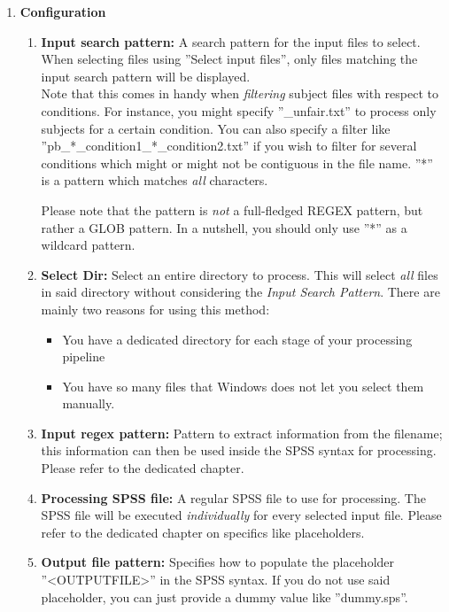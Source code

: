 \documentclass[]{article}
\newcommand{\ph}[1]{{\textless}#1{\textgreater}}
\begin{document}
\begin{enumerate}
	\item \textbf{Configuration}
\begin{enumerate}
	\item \textbf{Input search pattern:} A search pattern for the input files to select. When selecting files using ''Select input files'', only files matching the input search pattern will be displayed. \\
	
	Note that this comes in handy when \textit{filtering} subject files with respect to conditions. For instance, you might specify ''\_unfair.txt'' to process only subjects for a certain condition. You can also specify a filter like ''pb\_*\_condition1\_*\_condition2.txt'' if you wish to filter for several conditions which might or might not be contiguous in the file name. ''*'' is a pattern which matches \textit{all} characters. 
	
	Please note that the pattern is \textit{not} a full-fledged REGEX pattern, but rather a GLOB pattern. In a nutshell, you should only use ''*'' as a wildcard pattern. 
	
	\item \textbf{Select Dir:} Select an entire directory to process. This will select \textit{all} files in said directory without considering the \textit{Input Search Pattern}. There are mainly two reasons for using this method:
	
	\begin{itemize}
		\item You have a dedicated directory for each stage of your processing pipeline
		\item You have so many files that Windows does not let you select them manually. 
	\end{itemize}

	\item \textbf{Input regex pattern:} Pattern to extract information from the filename; this information can then be used inside the SPSS syntax for processing. Please refer to the dedicated chapter. 
	
	\item \textbf{Processing SPSS file:} A regular SPSS file to use for processing. The SPSS file will be executed \textit{individually} for every selected input file. Please refer to the dedicated chapter on specifics like placeholders. 
	
	\item \textbf{Output file pattern:} Specifies how to populate the placeholder ''\ph{OUTPUTFILE}'' in the SPSS syntax. If you do not use said placeholder, you can just provide a dummy value like ''dummy.sps''. 
	

\end{enumerate}
\end{enumerate}
\end{document}
